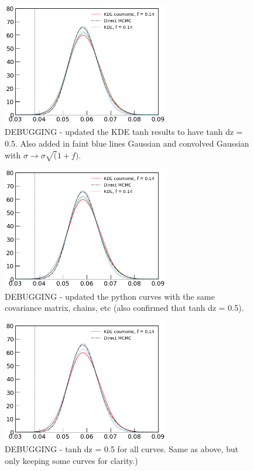 \documentclass[prd,amsmath,amssymb,floatfix,superscriptaddress,nofootinbib]{revtex4-1}
\begin{document}
\begin{figure}
\includegraphics[width=0.65\textwidth]{cosmomc_kde/pl18_relike_tanh_tau_dz0p5_1D_direct_vs_fortran_and_python_kde.png}
\caption{DEBUGGING - updated the KDE tanh results to have tanh dz = 0.5. Also added in faint blue lines Gaussian and convolved Gaussian with $\sigma \rightarrow \sigma \sqrt(1+f)$.
}
\label{fig:}
\end{figure}


\begin{figure}
\includegraphics[width=0.65\textwidth]{cosmomc_kde/pl18_relike_tanh_tau_dz0p5_1D_direct_vs_fortran_and_python_kde_double_checked_python.png}
\caption{DEBUGGING - updated the python curves with the same covariance matrix, chains, etc (also confirmed that tanh dz = 0.5). 
}
\label{fig:}
\end{figure}

\begin{figure}
\includegraphics[width=0.65\textwidth]{ cosmomc_kde/pl18_relike_tanh_tau_dz0p5_1D_direct_vs_fortran_kde.png}
\caption{DEBUGGING - tanh dz = 0.5 for all curves. Same as above, but only keeping some curves for clarity.)
}
\label{fig:}
\end{figure}
\end{document}
